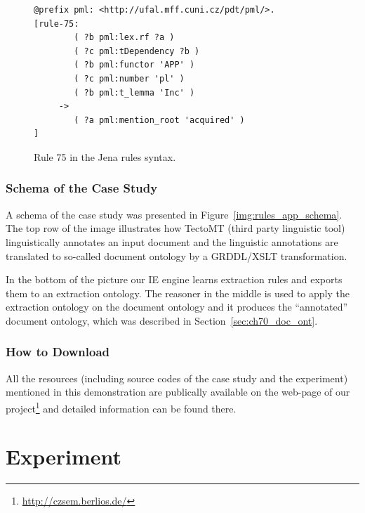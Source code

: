 \begin{figure}
\begin{verbatim}
@prefix pml: <http://ufal.mff.cuni.cz/pdt/pml/>.
[rule-75:  
        ( ?b pml:lex.rf ?a )
        ( ?c pml:tDependency ?b )
        ( ?b pml:functor 'APP' )
        ( ?c pml:number 'pl' )
        ( ?b pml:t_lemma 'Inc' )
     -> 
        ( ?a pml:mention_root 'acquired' )
]
\end{verbatim}
\caption{Rule 75 in the Jena rules syntax.}
\label{img:rules_jena}
\end{figure}


\subsubsection{Schema of the Case Study}


A schema of the case study was presented in Figure~\ref{img:rules_app_schema}.  
The top row of the image illustrates how TectoMT (third party linguistic tool) linguistically annotates an input document and the linguistic annotations are translated to so-called document ontology by a GRDDL/XSLT transformation.

In the bottom of the picture our IE engine learns extraction rules and exports them to an extraction ontology. The reasoner in the middle is used to apply the extraction ontology on the document ontology and it produces the ``annotated'' document ontology, which was described in Section~\ref{sec:ch70_doc_ont}.




\subsubsection{How to Download}
All the resources (including source codes of the case study and the experiment) mentioned in this demonstration are publically available on the web-page of our project\footnote{\url{http://czsem.berlios.de/}} and detailed information can be found there.


\section{Experiment} \label{sec:ch70_experiment}


